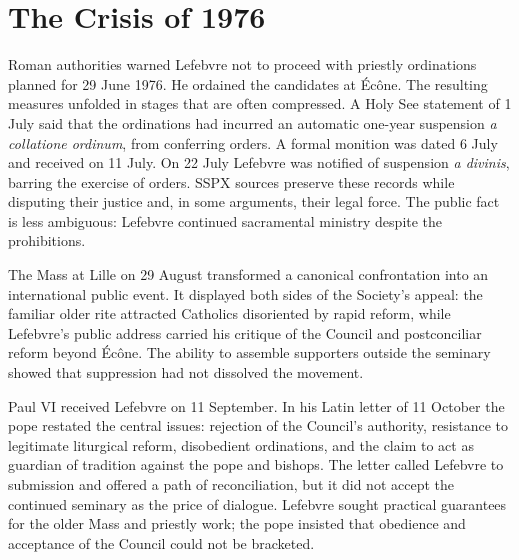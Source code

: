 \section{The Crisis of 1976}

Roman authorities warned Lefebvre not to proceed with priestly ordinations planned for 29 June 1976. He ordained the candidates at Écône. The resulting measures unfolded in stages that are often compressed. A Holy See statement of 1 July said that the ordinations had incurred an automatic one-year suspension \emph{a collatione ordinum}, from conferring orders. A formal monition was dated 6 July and received on 11 July. On 22 July Lefebvre was notified of suspension \emph{a divinis}, barring the exercise of orders. SSPX sources preserve these records while disputing their justice and, in some arguments, their legal force. The public fact is less ambiguous: Lefebvre continued sacramental ministry despite the prohibitions.

The Mass at Lille on 29 August transformed a canonical confrontation into an international public event. It displayed both sides of the Society's appeal: the familiar older rite attracted Catholics disoriented by rapid reform, while Lefebvre's public address carried his critique of the Council and postconciliar reform beyond Écône. The ability to assemble supporters outside the seminary showed that suppression had not dissolved the movement.

Paul VI received Lefebvre on 11 September. In his Latin letter of 11 October the pope restated the central issues: rejection of the Council's authority, resistance to legitimate liturgical reform, disobedient ordinations, and the claim to act as guardian of tradition against the pope and bishops. The letter called Lefebvre to submission and offered a path of reconciliation, but it did not accept the continued seminary as the price of dialogue. Lefebvre sought practical guarantees for the older Mass and priestly work; the pope insisted that obedience and acceptance of the Council could not be bracketed.


